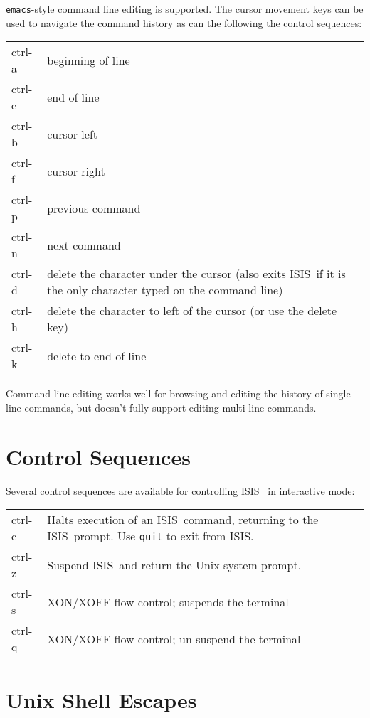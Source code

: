 \documentclass{book}
\newcommand{\isisx}{{\sc ISIS~}}
\begin{document}
{{\tt emacs}-style command line editing is supported.  The cursor
movement keys can be used to navigate the command history as can
the following the control sequences:

\begin{center}
\begin{tabular}{|l|p{4.5in}|}
\hline
ctrl-a  &  beginning of line \\
ctrl-e  &  end of line \\
ctrl-b  &  cursor left \\
ctrl-f  &  cursor right \\
ctrl-p  &  previous command \\
ctrl-n  &  next command \\
ctrl-d  &  delete the character under the cursor (also exits \isisx if it
          is the only character typed on the command line) \\
ctrl-h  &  delete the character to left of the cursor (or use the delete key) \\
ctrl-k  &  delete to end of line \\
\hline
\end{tabular}
\end{center}

Command line editing works well for browsing and editing the history
of single-line commands, but doesn't fully support editing
multi-line commands.

\section{Control Sequences}

Several control sequences are available for controlling \isisx
in interactive mode:

\begin{center}
\begin{tabular}{|l|p{4.5in}|}
\hline
ctrl-c  &  Halts execution of an \isisx command, returning to the \isisx prompt.
           Use {\tt quit} to exit from ISIS. \\
ctrl-z  &  Suspend \isisx and return the Unix system prompt. \\
ctrl-s  &  XON/XOFF flow control; suspends the terminal\\
ctrl-q  &  XON/XOFF flow control; un-suspend the terminal\\
\hline
\end{tabular}
\end{center}

\section{Unix Shell Escapes}

}
\end{document}
